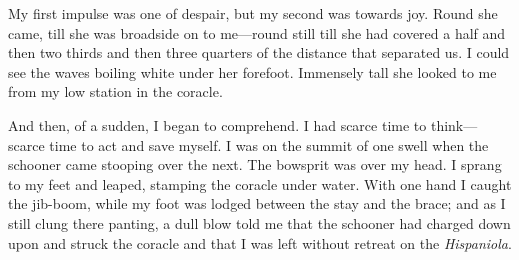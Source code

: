 My first impulse was one of despair, but my second was towards joy. Round she came, till she was broadside on to me—round still till she had covered a half and then two thirds and then three quarters of the distance that separated us. I could see the waves boiling white under her forefoot. Immensely tall she looked to me from my low station in the coracle.

And then, of a sudden, I began to comprehend. I had scarce time to think—scarce time to act and save myself. I was on the summit of one swell when the schooner came stooping over the next. The bowsprit was over my head. I sprang to my feet and leaped, stamping the coracle under water. With one hand I caught the jib-boom, while my foot was lodged between the stay and the brace; and as I still clung there panting, a dull blow told me that the schooner had charged down upon and struck the coracle and that I was left without retreat on the \textit{Hispaniola}.